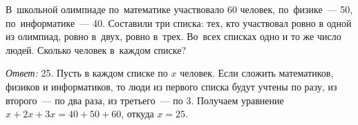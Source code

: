 \problem
В~школьной олимпиаде по~математике участвовало 60 человек, по~физике~--- 50,
по~информатике~--- 40.
Составили три списка: тех, кто участвовал ровно в одной из олимпиад, ровно
в~двух, ровно в~трех.
Во~всех списках одно и то же число людей.
Сколько человек в~каждом списке?

\solution
\emph{Ответ:} 25.
Пусть в каждом списке по $x$ человек.
Если сложить математиков, физиков и информатиков, то люди из первого списка
будут учтены по разу, из второго~--- по два раза, из третьего~--- по 3.
Получаем уравнение $x + 2 x + 3 x = 40 + 50 + 60$, откуда $x = 25$.
\endproblem
